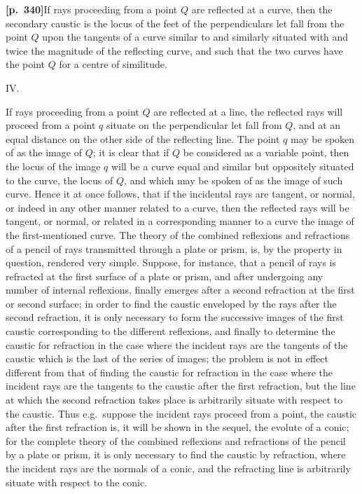 \documentclass[11pt]{article}
\begin{document}
\medskip
\noindent\textbf{[p.~340]}\quad If rays proceeding from a point $Q$ are reflected at a curve, then the secondary caustic is the locus of the feet of the perpendiculars let fall from the point $Q$ upon the tangents of a curve similar to and similarly situated with and twice the magnitude of the reflecting curve, and such that the two curves have the point $Q$ for a centre of similitude.

\medskip
\begin{center}IV.\end{center}

If rays proceeding from a point $Q$ are reflected at a line, the reflected rays will proceed from a point $q$ situate on the perpendicular let fall from $Q$, and at an equal distance on the other side of the reflecting line. The point $q$ may be spoken of as the image of $Q$; it is clear that if $Q$ be considered as a variable point, then the locus of the image $q$ will be a curve equal and similar but oppositely situated to the curve, the locus of $Q$, and which may be spoken of as the image of such curve. Hence it at once follows, that if the incidental rays are tangent, or normal, or indeed in any other manner related to a curve, then the reflected rays will be tangent, or normal, or related in a corresponding manner to a curve the image of the first-mentioned curve. The theory of the combined reflexions and refractions of a pencil of rays transmitted through a plate or prism, is, by the property in question, rendered very simple. Suppose, for instance, that a pencil of rays is refracted at the first surface of a plate or prism, and after undergoing any number of internal reflexions, finally emerges after a second refraction at the first or second surface; in order to find the caustic enveloped by the rays after the second refraction, it is only necessary to form the successive images of the first caustic corresponding to the different reflexions, and finally to determine the caustic for refraction in the case where the incident rays are the tangents of the caustic which is the last of the series of images; the problem is not in effect different from that of finding the caustic for refraction in the case where the incident rays are the tangents to the caustic after the first refraction, but the line at which the second refraction takes place is arbitrarily situate with respect to the caustic. Thus e.g.\ suppose the incident rays proceed from a point, the caustic after the first refraction is, it will be shown in the sequel, the evolute of a conic; for the complete theory of the combined reflexions and refractions of the pencil by a plate or prism, it is only necessary to find the caustic by refraction, where the incident rays are the normals of a conic, and the refracting line is arbitrarily situate with respect to the conic.
\end{document}
